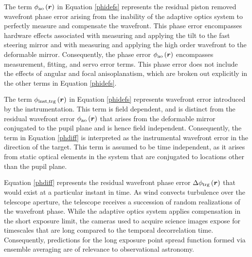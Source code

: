 The term $\phi_{\rm ao}\left(\boldsymbol{r}\right)$ in Equation
\ref{phidefs} represents the residual piston removed wavefront phase
error arising from the inability of the adaptive optics system to
perfectly measure and compensate the wavefront.  This phase error
encompasses hardware effects associated with measuring and applying
the tilt to the fast steering mirror and with measuring and applying
the high order wavefront to the deformable mirror.  Consequently, the
phase error $\phi_{\rm ao}\left(\boldsymbol{r}\right)$ encompasses
measurement, fitting, and servo error terms.  This phase error does
not include the effects of angular and focal anisoplanatism, which
are broken out explicitly in the other terms in Equation
\ref{phidefs}.

The term $\phi_{\rm inst,trg}\left(\boldsymbol{r}\right)$ in Equation
\ref{phidefs} represents wavefront error introduced by the
instrumentation.  This term is field dependent, and is distinct from
the residual wavefront error $\phi_{\rm
  ao}\left(\boldsymbol{r}\right)$ that arises from the deformable
mirror conjugated to the pupil plane and is hence field independent.
Consequently, the term in Equation \ref{phdiff} is interpreted as the
instrumental wavefront error in the direction of the target.  This
term is assumed to be time independent, as it arises from static
optical elements in the system that are conjugated to locations other
than the pupil plane.  

Equation \ref{phdiff} represents the residual wavefront phase error
$\Delta\phi_{\rm trg}\left(\boldsymbol{r}\right)$ that would exist at
a particular instant in time.  As wind convects turbulence over the
telescope aperture, the telescope receives a succession of random
realizations of the wavefront phase.  While the adaptive optics system
applies compensation in the short exposure limit, the cameras used to
acquire science images expose for timescales that are long compared to
the temporal decorrelation time.  Consequently, predictions for the
long exposure point spread function formed via ensemble averaging are
of relevance to observational astronomy.

